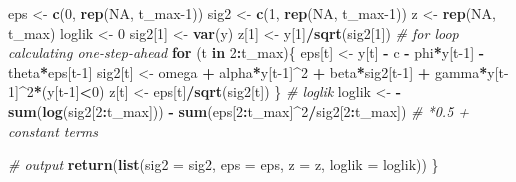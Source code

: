 \documentclass[
]{book}
\newenvironment{Shaded}{\begin{snugshade}}{\end{snugshade}}
\newcommand{\AttributeTok}[1]{\textcolor[rgb]{0.13,0.29,0.53}{#1}}
\newcommand{\CommentTok}[1]{\textcolor[rgb]{0.56,0.35,0.01}{\textit{#1}}}
\newcommand{\ConstantTok}[1]{\textcolor[rgb]{0.56,0.35,0.01}{#1}}
\newcommand{\ControlFlowTok}[1]{\textcolor[rgb]{0.13,0.29,0.53}{\textbf{#1}}}
\newcommand{\DecValTok}[1]{\textcolor[rgb]{0.00,0.00,0.81}{#1}}
\newcommand{\FunctionTok}[1]{\textcolor[rgb]{0.13,0.29,0.53}{\textbf{#1}}}
\newcommand{\NormalTok}[1]{#1}
\newcommand{\OtherTok}[1]{\textcolor[rgb]{0.56,0.35,0.01}{#1}}
\newcommand{\SpecialCharTok}[1]{\textcolor[rgb]{0.81,0.36,0.00}{\textbf{#1}}}
\begin{document}
\begin{Shaded}
\begin{Highlighting}[]
\NormalTok{  eps  }\OtherTok{\textless{}{-}} \FunctionTok{c}\NormalTok{(}\DecValTok{0}\NormalTok{, }\FunctionTok{rep}\NormalTok{(}\ConstantTok{NA}\NormalTok{, t\_max}\DecValTok{{-}1}\NormalTok{))}
\NormalTok{  sig2 }\OtherTok{\textless{}{-}} \FunctionTok{c}\NormalTok{(}\DecValTok{1}\NormalTok{, }\FunctionTok{rep}\NormalTok{(}\ConstantTok{NA}\NormalTok{, t\_max}\DecValTok{{-}1}\NormalTok{))}
\NormalTok{  z    }\OtherTok{\textless{}{-}} \FunctionTok{rep}\NormalTok{(}\ConstantTok{NA}\NormalTok{, t\_max)}
\NormalTok{  loglik }\OtherTok{\textless{}{-}} \DecValTok{0}
\NormalTok{  sig2[}\DecValTok{1}\NormalTok{] }\OtherTok{\textless{}{-}} \FunctionTok{var}\NormalTok{(y)}
\NormalTok{  z[}\DecValTok{1}\NormalTok{]    }\OtherTok{\textless{}{-}}\NormalTok{ y[}\DecValTok{1}\NormalTok{]}\SpecialCharTok{/}\FunctionTok{sqrt}\NormalTok{(sig2[}\DecValTok{1}\NormalTok{])}
  \CommentTok{\# for loop calculating one{-}step{-}ahead}
  \ControlFlowTok{for}\NormalTok{ (t }\ControlFlowTok{in} \DecValTok{2}\SpecialCharTok{:}\NormalTok{t\_max)\{}
\NormalTok{    eps[t]  }\OtherTok{\textless{}{-}}\NormalTok{ y[t] }\SpecialCharTok{{-}}\NormalTok{ c }\SpecialCharTok{{-}}\NormalTok{ phi}\SpecialCharTok{*}\NormalTok{y[t}\DecValTok{{-}1}\NormalTok{] }\SpecialCharTok{{-}}\NormalTok{ theta}\SpecialCharTok{*}\NormalTok{eps[t}\DecValTok{{-}1}\NormalTok{]}
\NormalTok{    sig2[t] }\OtherTok{\textless{}{-}}\NormalTok{ omega }\SpecialCharTok{+}\NormalTok{ alpha}\SpecialCharTok{*}\NormalTok{y[t}\DecValTok{{-}1}\NormalTok{]}\SpecialCharTok{\^{}}\DecValTok{2} \SpecialCharTok{+}\NormalTok{ beta}\SpecialCharTok{*}\NormalTok{sig2[t}\DecValTok{{-}1}\NormalTok{] }\SpecialCharTok{+}\NormalTok{ gamma}\SpecialCharTok{*}\NormalTok{y[t}\DecValTok{{-}1}\NormalTok{]}\SpecialCharTok{\^{}}\DecValTok{2}\SpecialCharTok{*}\NormalTok{(y[t}\DecValTok{{-}1}\NormalTok{]}\SpecialCharTok{\textless{}}\DecValTok{0}\NormalTok{)}
\NormalTok{    z[t]    }\OtherTok{\textless{}{-}}\NormalTok{ eps[t]}\SpecialCharTok{/}\FunctionTok{sqrt}\NormalTok{(sig2[t])}
\NormalTok{  \}}
  \CommentTok{\# loglik}
\NormalTok{  loglik }\OtherTok{\textless{}{-}}  \SpecialCharTok{{-}} \FunctionTok{sum}\NormalTok{(}\FunctionTok{log}\NormalTok{(sig2[}\DecValTok{2}\SpecialCharTok{:}\NormalTok{t\_max])) }\SpecialCharTok{{-}} \FunctionTok{sum}\NormalTok{(eps[}\DecValTok{2}\SpecialCharTok{:}\NormalTok{t\_max]}\SpecialCharTok{\^{}}\DecValTok{2}\SpecialCharTok{/}\NormalTok{sig2[}\DecValTok{2}\SpecialCharTok{:}\NormalTok{t\_max])  }\CommentTok{\# *0.5 + constant terms }
  
  \CommentTok{\# output}
  \FunctionTok{return}\NormalTok{(}\FunctionTok{list}\NormalTok{(}\AttributeTok{sig2   =}\NormalTok{ sig2, }
              \AttributeTok{eps    =}\NormalTok{ eps,}
              \AttributeTok{z      =}\NormalTok{ z, }
              \AttributeTok{loglik =}\NormalTok{ loglik))}
\NormalTok{\}}
\end{Highlighting}
\end{Shaded}
\end{document}
